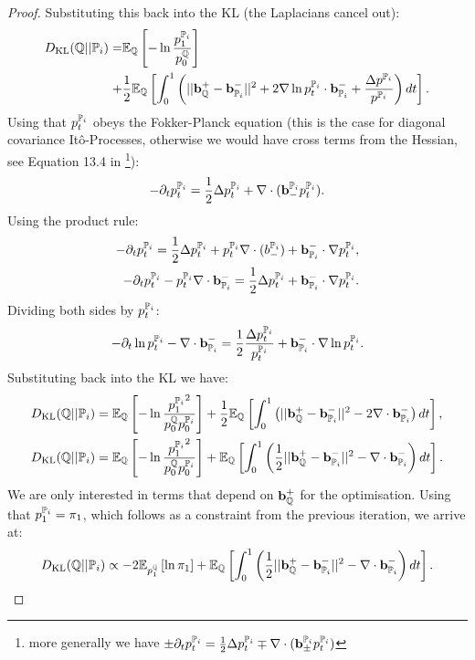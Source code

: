 \documentclass[a4paper,12pt,twoside,openright]{report}
\theoremstyle{definition}
\begin{document}
\begin{proof}
Substituting this back into the KL (the Laplacians cancel out):
\begin{align*}
\KL(\Q||{\P_{i}}) = &\E_\Q\left[-\log \frac{ p^{\P_{i}}_1}{ p^\Q_0}\right] \\+ &\frac{1}{2}\E_{\Q}\left[\int_0^1 \left(|| \rvb_\Q^{+} - \rvb_{\P_{i}}^{-}||^2 + 2\nabla\log p_t^{\P_{i}} \cdot \rvb_{\P_{i}}^{-}+ \frac{\Delta  p^{\P_{i}}}{ p^{\P_{i}}}\right)dt\right].
\end{align*}
Using that $ p_t^{\P_{i}}$ obeys the Fokker-Planck equation (this is the case for diagonal covariance Itô-Processes, otherwise we would have cross terms from the Hessian, see Equation 13.4 in \cite{nelson1967dynamical}\footnote{more generally we have $\pm\partial_t p_t^{\P_{i}} = \frac{1}{2}\Delta p_t^{\P_{i}}\mp\nabla\cdot(\rvb_\pm^{\P_{i}} p_t^{\P_{i}})$}): 
\begin{align*}
-\partial_t p_t^{\P_{i}} = \frac{1}{2}\Delta p_t^{\P_{i}}+\nabla\cdot(\rvb_{-}^{\P_{i}} p_t^{\P_{i}}).
\end{align*}
Using the product rule: 
\begin{align*}
-\partial_t p_t^{\P_{i}} = \frac{1}{2}\Delta p_t^{\P_{i}}+  p_t^{\P_{i}} \nabla\cdot(b_{-}^{\P_{i}}) + \rvb^{-}_{\P_{i}} \cdot \nabla p_t^{\P_{i}}, \\
-\partial_t p_t^{\P_{i}} -  p_t^{\P_{i}} \nabla\cdot \rvb^{-}_{\P_{i}}  = \frac{1}{2}\Delta p_t^{\P_{i}}+ \rvb^{-}_{\P_{i}} \cdot\nabla  p_t^{\P_{i}}.
\end{align*}
Dividing both sides by $ p_t^{\P_{i}}$:
\begin{align*}
-\partial_t \log  p_t^{\P_{i}} - \nabla\cdot \rvb^{-}_{\P_{i}}  = \frac{1}{2}\frac{\Delta  p_t^{\P_{i}}}{ p_t^{\P_{i}}}+  \rvb^{-}_{\P_{i}} \cdot \nabla \log  p_t^{\P_{i}}.
\end{align*}
Substituting back into the KL we have:
\begin{align*}
\KL(\Q||{\P_{i}}) &= \E_\Q\left[-\log \frac{{ p^{\P_{i}}_1}^2}{ p^\Q_0  p_0^{{\P_{i}}}}\right] + \frac{1}{2}\E_{\Q}\left[\int_0^1 \left(|| \rvb_\Q^{+} - \rvb_{\P_{i}}^{-}||^2 - 2\nabla\cdot \rvb^{-}_{\P_{i}} \right)dt\right], \\
\KL(\Q||{\P_{i}}) &= \E_\Q\left[-\log \frac{{ p^{\P_{i}}_1}^2}{ p^\Q_0   p_0^{{\P_{i}}}}\right] + \E_{\Q}\left[\int_0^1 \left(\frac{1}{2}|| \rvb_\Q^{+} - \rvb_{\P_{i}}^{-}||^2 - \nabla\cdot \rvb^{-}_{\P_{i}} \right)dt\right].
\end{align*}
We are only interested in terms that depend on $\rvb^{+}_\Q$ for the optimisation. Using that $p^{\P_{i}}_1=\pi_1$, which follows as a constraint from the previous iteration, we arrive at:
\begin{align}
\KL(\Q||{\P_{i}}) \propto -2\E_{ p^\Q_1}\left[\log {{ \pi_1 }} \right] + \E_{\Q}\left[\int_0^1 \left(\frac{1}{2}|| \rvb_\Q^{+} - \rvb_{\P_{i}}^{-}||^2 - \nabla\cdot \rvb^{-}_{\P_{i}} \right)dt\right].
\end{align}
\end{proof}
\end{document}
